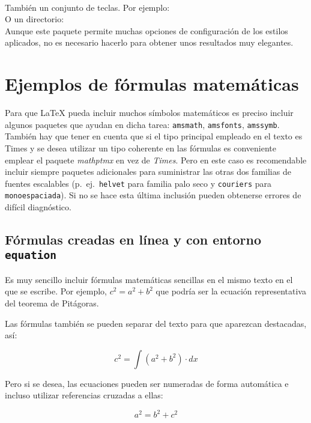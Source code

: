 \\

\noindent También un conjunto de teclas. Por ejemplo:
\\

\noindent O un directorio:
\\

\noindent Aunque este paquete permite muchas opciones de configuración de los estilos aplicados, no es necesario hacerlo para obtener unos resultados muy elegantes.



\section{Ejemplos de fórmulas matemáticas}
Para que \LaTeX{} pueda incluir muchos símbolos matemáticos es preciso incluir algunos paquetes que ayudan en dicha tarea: \texttt{amsmath}, \texttt{amsfonts}, \texttt{amssymb}. También hay que tener en cuenta que si el tipo principal empleado en el texto es Times y se desea utilizar un tipo coherente en las fórmulas es conveniente emplear el paquete \emph{mathptmx} en vez de \emph{Times}. Pero en este caso es recomendable incluir siempre paquetes adicionales para suministrar las otras dos familias de fuentes escalables (p.~ej.\ \texttt{helvet} para familia \textsf{palo seco} y \texttt{couriers} para \texttt{monoespaciada}). Si no se hace esta última inclusión pueden obtenerse errores de difícil diagnóstico.



\subsection{Fórmulas creadas en línea y con entorno \texttt{equation}}
Es muy sencillo incluir fórmulas matemáticas sencillas en el mismo texto en el que se escribe. Por ejemplo, $c^{2}=a^{2}+b^{2}$ que podría ser la ecuación representativa del teorema de Pitágoras.

Las fórmulas también se pueden separar del texto para que aparezcan destacadas, así:

\[
c^2  = \int {\left( {a^2  + b^2} \right)}  \cdot dx
\]


Pero si se desea, las ecuaciones pueden ser numeradas de forma automática e incluso utilizar referencias cruzadas a ellas:

\begin{equation} \label{eq:pitagoras}
	a^{2}=b^{2} + c^{2}
\end{equation}

